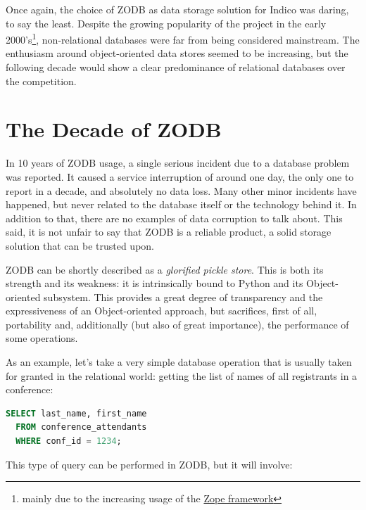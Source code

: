 \par Once again, the choice of \textsc{ZODB} as data storage solution for Indico was daring, to say the least. Despite the growing popularity of the project in the early 2000's\footnote{mainly due to the increasing usage of the \href{http://zope2.zope.org/}{Zope framework}}, non-relational databases were far from being considered mainstream. The enthusiasm around object-oriented data stores seemed to be increasing, but the following decade would show a clear predominance of relational databases over the competition.

\section{The Decade of ZODB} 

\par In 10 years of \textsc{ZODB} usage, a single serious incident due to a database problem was reported. It caused a service interruption of around one day, the only one to report in a decade, and absolutely no data loss. Many other minor incidents have happened, but never related to the database itself or the technology behind it. In addition to that, there are no examples of data corruption to talk about. This said, it is not unfair to say that \textsc{ZODB} is a reliable product, a solid storage solution that can be trusted upon.

\textsc{ZODB} can be shortly described as a \textit{glorified pickle store}. This is both its strength and its weakness: it is intrinsically bound to Python and its Object-oriented subsystem. This provides a great degree of transparency and the expressiveness of an Object-oriented approach, but sacrifices, first of all, portability and, additionally (but also of great importance), the performance of some operations.

As an example, let's take a very simple database operation that is usually taken for granted in the relational world: getting the list of names of all registrants in a conference:

\begin{lstlisting}[language=SQL]
  SELECT last_name, first_name
  FROM conference_attendants
  WHERE conf_id = 1234;
\end{lstlisting}

This type of query can be performed in \textsc{ZODB}, but it will involve:

